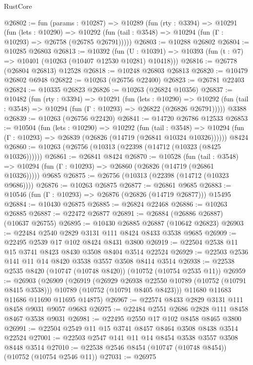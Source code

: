 \begin{lexlean}{RustCore}
\begin{coremodule}
@26802 := fun (params : @10287) =>
  @10289
    (fun (rty : @3394) =>
    @10291
      (fun (lets : @10290) =>
      @10292 (fun (tail : @3548) => @10294 (fun (Γ : @10293) => @26758 (@26785 @26791)))))
@26803 := @10288 @26802
@26804 := @10285 @26803
@26813 := @10392
    (fun (U : @10391) => @10393 (fun (t : @7) => @10401 (@10263 (@10407 @12530 @10281) @10418)))
@26816 := @26778 (@26804 @26813) @12528
@26818 := @10248 @26803 @26813
@26820 := @10479 @26802 @6948
@26822 := @10263 (@26756 @22400)
@26823 := @26781 @22403
@26824 := @10335 @26823
@26826 := @10263 (@26824 @10356)
@26837 := @10482
    (fun (rty : @3394) =>
    @10291
      (fun (lets : @10290) =>
      @10292 (fun (tail : @3548) => @10294 (fun (Γ : @10293) => @26822 (@26826 @26791)))))
    @3388
@26839 := @10263 (@26756 @22420)
@26841 := @14720 @26786 @12533
@26853 := @10504
    (fun (lets : @10290) =>
    @10292
      (fun (tail : @3548) =>
      @10294 (fun (Γ : @10293) => @26839 (@26826 (@14719 (@26841 @10324 @10326))))))
    @8424
@26860 := @10263 (@26756 (@10313 (@22398 (@14712 (@10323 (@8425 @10326))))))
@26861 := @26841 @8424
@26870 := @10528
    (fun (tail : @3548) => @10294 (fun (Γ : @10293) => @26860 (@26826 (@14719 (@26861 @10326)))))
    @9685
@26875 := @26756 (@10313 (@22398 (@14712 (@10323 @9686))))
@26876 := @10263 @26875
@26877 := @26861 @9685
@26883 := @10546 (fun (Γ : @10293) => @26876 (@26826 (@14719 @26877))) @15495
@26884 := @10430 @26875
@26885 := @26824 @22468
@26886 := @10263 @26885
@26887 := @22472 @26877
@26891 := @26884 (@26886 @26887) (@10637 @26755)
@26895 := @10430 @26885 @26887 (@10642 @26823)
@26903 := @22484 @2540 @2829 @3131 @111 @8424 @8433 @3538 @9685
@26909 := @22495 @2539 @17 @102 @8424 @8431 @3800
@26919 := @22504 @2538 @11 @15 @3741 @8423 @8430 @3508 @8404 @3514 @22524
@26929 := @22503 @2536 @141 @11 @14 @8420 @3538 @3557 @3508 @8414 @3514
@26938 := @22538 @2535 @8420 (@10747 (@10748 @8420)) (@10752 (@10754 @2535 @11))
@26959 := @26903
    (@26909
      (@26919
        (@26929 @26938 @22550 @10789 (@10752 (@10791 @8415 @3538)))
        @10789
        (@10752 (@10791 @8405 @8423)))
      @11680
      @11683
      @11686
      @11690
      @11695
      @14875)
@26967 := @22574 @8433 @2829 @3131 @111 @8458 @9031 @9057 @9683
@26975 := @22484 @2551 @2686 @2828 @111 @8458 @8467 @3538 @9031
@26981 := @22495 @2550 @17 @102 @8458 @8465 @3800
@26991 := @22504 @2549 @11 @15 @3741 @8457 @8464 @3508 @8438 @3514 @22524
@27001 := @22503 @2547 @141 @11 @14 @8454 @3538 @3557 @3508 @8448 @3514
@27010 := @22538 @2546 @8454 (@10747 (@10748 @8454)) (@10752 (@10754 @2546 @11))
@27031 := @26975

\end{coremodule}
\end{lexlean}
